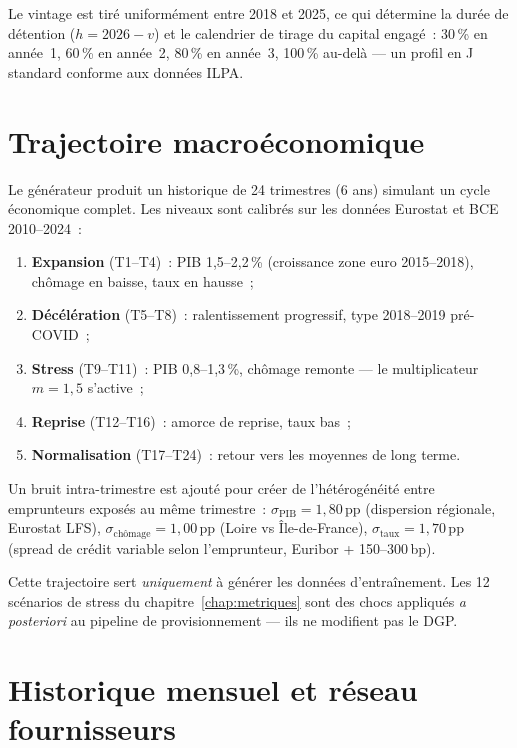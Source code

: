 \documentclass[12pt, a4paper, twoside, openright]{report}
\theoremstyle{definition}
\begin{document}
Le vintage est tiré uniformément entre 2018 et 2025, ce qui détermine la durée de détention ($h = 2026 - v$) et le calendrier de tirage du capital engagé~: 30\,\% en année~1, 60\,\% en année~2, 80\,\% en année~3, 100\,\% au-delà --- un profil en J standard conforme aux données ILPA.


\section{Trajectoire macroéconomique}
\label{sec:donnees:macro}

Le générateur produit un historique de 24 trimestres (6 ans) simulant un cycle économique complet.
Les niveaux sont calibrés sur les données Eurostat et BCE 2010--2024~:

\begin{enumerate}[nosep]
  \item \textbf{Expansion} (T1--T4)~: PIB 1{,}5--2{,}2\,\% (croissance zone euro 2015--2018), chômage en baisse, taux en hausse~;
  \item \textbf{Décélération} (T5--T8)~: ralentissement progressif, type 2018--2019 pré-COVID~;
  \item \textbf{Stress} (T9--T11)~: PIB 0{,}8--1{,}3\,\%, chômage remonte --- le multiplicateur $m = 1{,}5$ s'active~;
  \item \textbf{Reprise} (T12--T16)~: amorce de reprise, taux bas~;
  \item \textbf{Normalisation} (T17--T24)~: retour vers les moyennes de long terme.
\end{enumerate}

Un bruit intra-trimestre est ajouté pour créer de l'hétérogénéité entre emprunteurs exposés au même trimestre~:
$\sigma_{\text{PIB}} = 1{,}80\,\text{pp}$ (dispersion régionale, Eurostat LFS), $\sigma_{\text{chômage}} = 1{,}00\,\text{pp}$ (Loire vs Île-de-France), $\sigma_{\text{taux}} = 1{,}70\,\text{pp}$ (spread de crédit variable selon l'emprunteur, Euribor + 150--300\,bp).

Cette trajectoire sert \emph{uniquement} à générer les données d'entraînement.
Les 12 scénarios de stress du chapitre~\ref{chap:metriques} sont des chocs appliqués \emph{a posteriori} au pipeline de provisionnement --- ils ne modifient pas le DGP.


\section{Historique mensuel et réseau fournisseurs}
\label{sec:donnees:historique}
\end{document}
